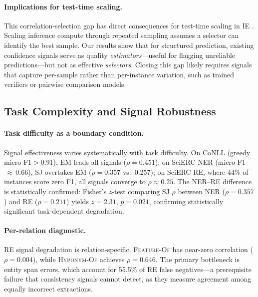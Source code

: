 \paragraph{Implications for test-time scaling.}
This correlation-selection gap has direct consequences for test-time scaling in IE \cite{brown2024monkeys, snell2024scaling}.
Scaling inference compute through repeated sampling assumes a selector can identify the best sample.
Our results show that for structured prediction, existing confidence signals serve as quality \textit{estimators}---useful for flagging unreliable predictions---but not as effective \textit{selectors}.
Closing this gap likely requires signals that capture per-sample rather than per-instance variation, such as trained verifiers \cite{cobbe2021verifiers} or pairwise comparison models.

\subsection{Task Complexity and Signal Robustness}
\label{sec:complexity_robustness}

\paragraph{Task difficulty as a boundary condition.}
Signal effectiveness varies systematically with task difficulty.
On CoNLL (greedy micro F1${>}$0.91), EM leads all signals ($\rho{=}0.451$); on SciERC NER (micro F1$\,{\approx}\,$0.66), SJ overtakes EM ($\rho{=}0.357$ vs.\ 0.257); on SciERC RE, where 44\% of instances score zero F1, all signals converge to $\rho{\approx}0.25$.
The NER--RE difference is statistically confirmed: Fisher's $z$-test comparing SJ $\rho$ between NER ($\rho{=}0.357$) and RE ($\rho{=}0.211$) yields $z{=}2.31$, $p{=}0.021$, confirming statistically significant task-dependent degradation.

\paragraph{Per-relation diagnostic.}
RE signal degradation is relation-specific.
\textsc{Feature-Of} has near-zero correlation ($\rho{=}0.004$), while \textsc{Hyponym-Of} achieves $\rho{=}0.646$.
The primary bottleneck is entity span errors, which account for 55.5\% of RE false negatives---a prerequisite failure that consistency signals cannot detect, as they measure agreement among equally incorrect extractions.

